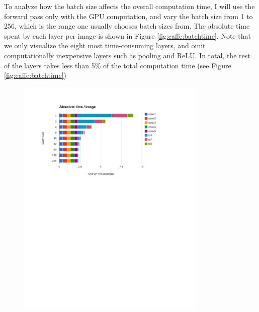 To analyze how the batch size affects the overall computation time, I will use the forward pass only with the GPU computation, and vary the batch size from 1 to 256, which is the range one usually chooses batch sizes from. The absolute time spent by each layer per image is shown in Figure \ref{fig:caffe:batchtime}. Note that we only visualize the eight most time-consuming layers, and omit computationally inexpensive layers such as pooling and ReLU. In total, the rest of the layers takes less than 5\% of the total computation time (see Figure \ref{fig:caffe:batchtime})

\begin{figure}
  \centering
  \includegraphics[width=0.8\textwidth]{figs/caffe/caffe_batchtime.pdf}\\

\end{figure}
